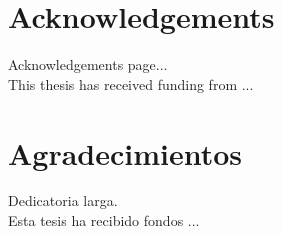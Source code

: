 \chapter*{Acknowledgements}
Acknowledgements page...\\




\vspace*{\fill}
This thesis has received funding from ...

\chapter*{Agradecimientos}
Dedicatoria larga.\\

\vspace*{\fill}
Esta tesis ha recibido fondos ...